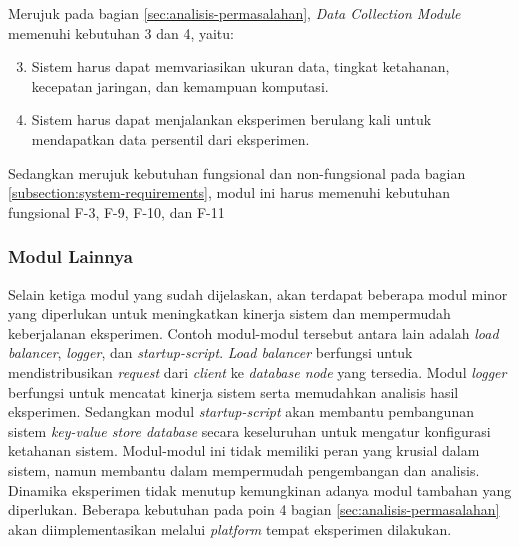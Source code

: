 Merujuk pada bagian \ref{sec:analisis-permasalahan}, \textit{Data Collection Module} memenuhi kebutuhan 3 dan 4, yaitu:

\begin{enumerate}
    \setcounter{enumi}{2}
    \item Sistem harus dapat memvariasikan ukuran data, tingkat ketahanan, kecepatan jaringan, dan kemampuan komputasi.
    \item Sistem harus dapat menjalankan eksperimen berulang kali untuk mendapatkan data persentil dari eksperimen.
\end{enumerate}

Sedangkan merujuk kebutuhan fungsional dan non-fungsional pada bagian \ref{subsection:system-requirements}, modul ini harus memenuhi kebutuhan fungsional F-3, F-9, F-10, dan F-11

\subsubsection{Modul Lainnya}
\label{subsubsection:other-modules}

Selain ketiga modul yang sudah dijelaskan, akan terdapat beberapa modul minor yang diperlukan untuk meningkatkan kinerja sistem dan mempermudah keberjalanan eksperimen. Contoh modul-modul tersebut antara lain adalah \textit{load balancer}, \textit{logger}, dan \textit{startup-script}. \textit{Load balancer} berfungsi untuk mendistribusikan \textit{request} dari \textit{client} ke \textit{database node} yang tersedia. Modul \textit{logger} berfungsi untuk mencatat kinerja sistem serta memudahkan analisis hasil eksperimen. Sedangkan modul \textit{startup-script} akan membantu pembangunan sistem \textit{key-value store database} secara keseluruhan untuk mengatur konfigurasi ketahanan sistem. Modul-modul ini tidak memiliki peran yang krusial dalam sistem, namun membantu dalam mempermudah pengembangan dan analisis. Dinamika eksperimen tidak menutup kemungkinan adanya modul tambahan yang diperlukan. Beberapa kebutuhan pada poin 4 bagian \ref{sec:analisis-permasalahan} akan diimplementasikan melalui \textit{platform} tempat eksperimen dilakukan.
